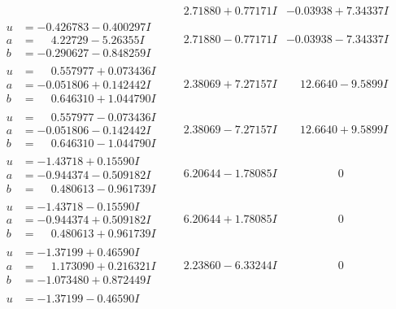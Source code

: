 \documentclass[1p]{elsarticle_modified}
\theoremstyle{definition}
\begin{document}
$$\begin{array}{c|c|c}
 & \phantom{-}2.71880 + 0.77171 I & -0.03938 + 7.34337 I \\ \hline\begin{aligned}
u &= -0.426783 - 0.400297 I \\
a &= \phantom{-}4.22729 - 5.26355 I \\
b &= -0.290627 - 0.848259 I\end{aligned}
 & \phantom{-}2.71880 - 0.77171 I & -0.03938 - 7.34337 I \\ \hline\begin{aligned}
u &= \phantom{-}0.557977 + 0.073436 I \\
a &= -0.051806 + 0.142442 I \\
b &= \phantom{-}0.646310 + 1.044790 I\end{aligned}
 & \phantom{-}2.38069 + 7.27157 I & \phantom{-}12.6640 - 9.5899 I \\ \hline\begin{aligned}
u &= \phantom{-}0.557977 - 0.073436 I \\
a &= -0.051806 - 0.142442 I \\
b &= \phantom{-}0.646310 - 1.044790 I\end{aligned}
 & \phantom{-}2.38069 - 7.27157 I & \phantom{-}12.6640 + 9.5899 I \\ \hline\begin{aligned}
u &= -1.43718 + 0.15590 I \\
a &= -0.944374 - 0.509182 I \\
b &= \phantom{-}0.480613 - 0.961739 I\end{aligned}
 & \phantom{-}6.20644 - 1.78085 I & \phantom{-0.000000 } 0 \\ \hline\begin{aligned}
u &= -1.43718 - 0.15590 I \\
a &= -0.944374 + 0.509182 I \\
b &= \phantom{-}0.480613 + 0.961739 I\end{aligned}
 & \phantom{-}6.20644 + 1.78085 I & \phantom{-0.000000 } 0 \\ \hline\begin{aligned}
u &= -1.37199 + 0.46590 I \\
a &= \phantom{-}1.173090 + 0.216321 I \\
b &= -1.073480 + 0.872449 I\end{aligned}
 & \phantom{-}2.23860 - 6.33244 I & \phantom{-0.000000 } 0 \\ \hline\begin{aligned}
u &= -1.37199 - 0.46590 I \\

\end{aligned}
\end{array}$$
\end{document}

